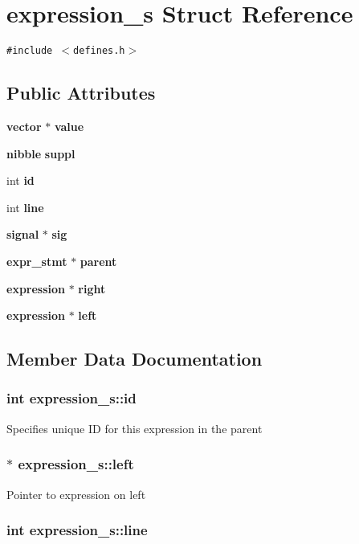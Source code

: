 \section{expression\_\-s  Struct Reference}
\label{structexpression__s}
{\tt \#include $<$defines.h$>$}

\subsection*{Public Attributes}
\begin{CompactItemize}
\item 
{\bf vector} $\ast$ {\bf value}
\item 
{\bf nibble} {\bf suppl}
\item 
int {\bf id}
\item 
int {\bf line}
\item 
{\bf signal} $\ast$ {\bf sig}
\item 
{\bf expr\_\-stmt} $\ast$ {\bf parent}
\item 
{\bf expression} $\ast$ {\bf right}
\item 
{\bf expression} $\ast$ {\bf left}
\end{CompactItemize}


\subsection{Member Data Documentation}
\subsubsection{\setlength{\rightskip}{0pt plus 5cm}int expression\_\-s::id}\label{structexpression__s_m2}


Specifies unique ID for this expression in the parent 
\subsubsection{$\ast$ expression\_\-s::left}\label{structexpression__s_m7}


Pointer to expression on left 
\subsubsection{\setlength{\rightskip}{0pt plus 5cm}int expression\_\-s::line}\label{structexpression__s_m3}


